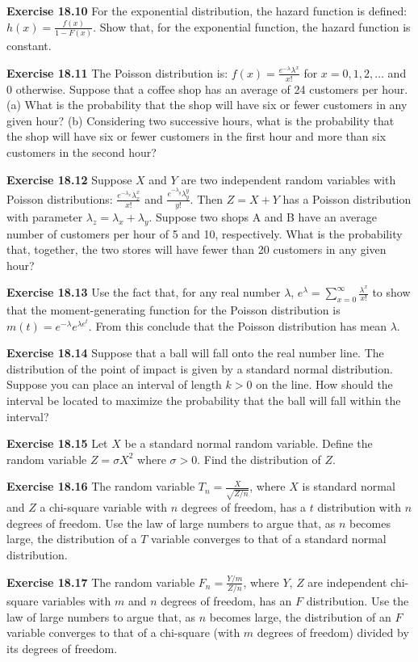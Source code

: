 \begin{original}
\textbf{Exercise 18.10} For the exponential distribution, the hazard function is defined: $h(x) = \frac{f(x)}{1 - F(x)}$. Show that, for the exponential function, the hazard function is constant.

\textbf{Exercise 18.11} The Poisson distribution is: $f(x) = \frac{e^{-\lambda}\lambda^x}{x!}$ for $x = 0, 1, 2, \ldots$ and $0$ otherwise. Suppose that a coffee shop has an average of 24 customers per hour.
(a) What is the probability that the shop will have six or fewer customers in any given hour?
(b) Considering two successive hours, what is the probability that the shop will have six or fewer customers in the first hour and more than six customers in the second hour?

\textbf{Exercise 18.12} Suppose $X$ and $Y$ are two independent random variables with Poisson distributions: $\frac{e^{-\lambda_x}\lambda_x^x}{x!}$ and $\frac{e^{-\lambda_y}\lambda_y^y}{y!}$. Then $Z = X + Y$ has a Poisson distribution with parameter $\lambda_z = \lambda_x + \lambda_y$. Suppose two shops A and B have an average number of customers per hour of 5 and 10, respectively. What is the probability that, together, the two stores will have fewer than 20 customers in any given hour?

\textbf{Exercise 18.13} Use the fact that, for any real number $\lambda$, $e^\lambda = \sum_{x=0}^{\infty} \frac{\lambda^x}{x!}$ to show that the moment-generating function for the Poisson distribution is $m(t) = e^{-\lambda}e^{\lambda e^t}$. From this conclude that the Poisson distribution has mean $\lambda$.

\textbf{Exercise 18.14} Suppose that a ball will fall onto the real number line. The distribution of the point of impact is given by a standard normal distribution. Suppose you can place an interval of length $k > 0$ on the line. How should the interval be located to maximize the probability that the ball will fall within the interval?

\textbf{Exercise 18.15} Let $X$ be a standard normal random variable. Define the random variable $Z = \sigma X^2$ where $\sigma > 0$. Find the distribution of $Z$.

\textbf{Exercise 18.16} The random variable $T_n = \frac{X}{\sqrt{Z/n}}$, where $X$ is standard normal and $Z$ a chi-square variable with $n$ degrees of freedom, has a $t$ distribution with $n$ degrees of freedom. Use the law of large numbers to argue that, as $n$ becomes large, the distribution of a $T$ variable converges to that of a standard normal distribution.

\textbf{Exercise 18.17} The random variable $F_n = \frac{Y/m}{Z/n}$, where $Y$, $Z$ are independent chi-square variables with $m$ and $n$ degrees of freedom, has an $F$ distribution. Use the law of large numbers to argue that, as $n$ becomes large, the distribution of an $F$ variable converges to that of a chi-square (with $m$ degrees of freedom) divided by its degrees of freedom.
\end{original}
